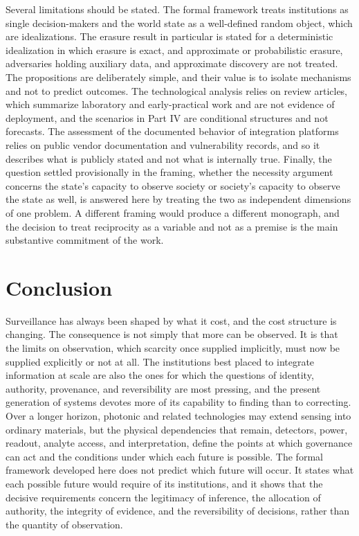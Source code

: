\documentclass[11pt]{article}
\theoremstyle{plain}
\theoremstyle{definition}
\theoremstyle{remark}
\begin{document}
Several limitations should be stated. The formal framework treats institutions as single decision-makers and the world state as a well-defined random object, which are idealizations. The erasure result in particular is stated for a deterministic idealization in which erasure is exact, and approximate or probabilistic erasure, adversaries holding auxiliary data, and approximate discovery are not treated. The propositions are deliberately simple, and their value is to isolate mechanisms and not to predict outcomes. The technological analysis relies on review articles, which summarize laboratory and early-practical work and are not evidence of deployment, and the scenarios in Part IV are conditional structures and not forecasts. The assessment of the documented behavior of integration platforms relies on public vendor documentation and vulnerability records, and so it describes what is publicly stated and not what is internally true. Finally, the question settled provisionally in the framing, whether the necessity argument concerns the state's capacity to observe society or society's capacity to observe the state as well, is answered here by treating the two as independent dimensions of one problem. A different framing would produce a different monograph, and the decision to treat reciprocity as a variable and not as a premise is the main substantive commitment of the work.

\section{Conclusion}

Surveillance has always been shaped by what it cost, and the cost structure is changing. The consequence is not simply that more can be observed. It is that the limits on observation, which scarcity once supplied implicitly, must now be supplied explicitly or not at all. The institutions best placed to integrate information at scale are also the ones for which the questions of identity, authority, provenance, and reversibility are most pressing, and the present generation of systems devotes more of its capability to finding than to correcting. Over a longer horizon, photonic and related technologies may extend sensing into ordinary materials, but the physical dependencies that remain, detectors, power, readout, analyte access, and interpretation, define the points at which governance can act and the conditions under which each future is possible. The formal framework developed here does not predict which future will occur. It states what each possible future would require of its institutions, and it shows that the decisive requirements concern the legitimacy of inference, the allocation of authority, the integrity of evidence, and the reversibility of decisions, rather than the quantity of observation.
\end{document}
